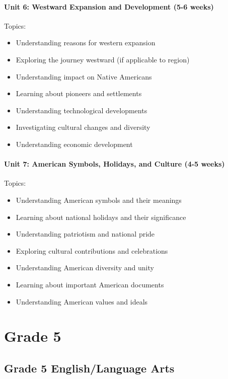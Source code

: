 \documentclass[11pt,letterpaper]{report}
\begin{document}
\subsection{Unit 6: Westward Expansion and Development (5-6 weeks)}

Topics:
\begin{itemize}
\item Understanding reasons for western expansion
\item Exploring the journey westward (if applicable to region)
\item Understanding impact on Native Americans
\item Learning about pioneers and settlements
\item Understanding technological developments
\item Investigating cultural changes and diversity
\item Understanding economic development
\end{itemize}

\subsection{Unit 7: American Symbols, Holidays, and Culture (4-5 weeks)}

Topics:
\begin{itemize}
\item Understanding American symbols and their meanings
\item Learning about national holidays and their significance
\item Understanding patriotism and national pride
\item Exploring cultural contributions and celebrations
\item Understanding American diversity and unity
\item Learning about important American documents
\item Understanding American values and ideals
\end{itemize}

\clearpage

\part{Grade 5}

\chapter{Grade 5 English/Language Arts}
\end{document}
